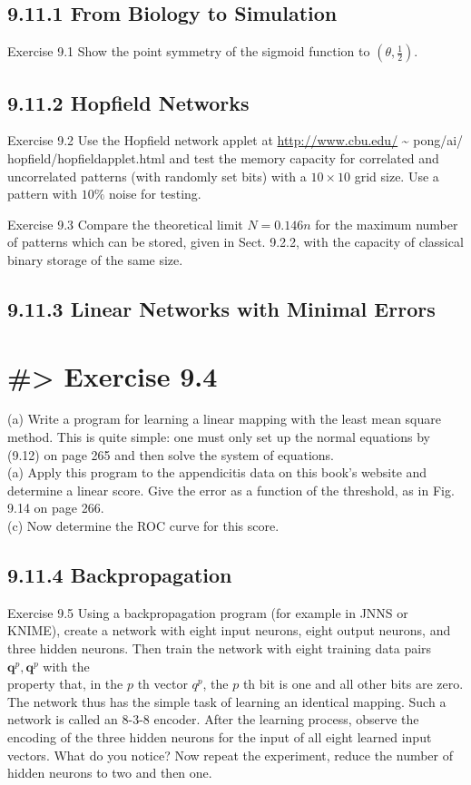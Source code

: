 \documentclass[10pt]{article}
\begin{document}
\subsection*{9.11.1 From Biology to Simulation}
Exercise 9.1 Show the point symmetry of the sigmoid function to $\left(\theta, \frac{1}{2}\right)$.

\subsection*{9.11.2 Hopfield Networks}
Exercise 9.2 Use the Hopfield network applet at \href{http://www.cbu.edu/}{http://www.cbu.edu/} \~{} pong/ai/ hopfield/hopfieldapplet.html and test the memory capacity for correlated and uncorrelated patterns (with randomly set bits) with a $10 \times 10$ grid size. Use a pattern with $10 \%$ noise for testing.

Exercise 9.3 Compare the theoretical limit $N=0.146 n$ for the maximum number of patterns which can be stored, given in Sect. 9.2.2, with the capacity of classical binary storage of the same size.

\subsection*{9.11.3 Linear Networks with Minimal Errors}
\section*{\#> Exercise 9.4}
(a) Write a program for learning a linear mapping with the least mean square method. This is quite simple: one must only set up the normal equations by (9.12) on page 265 and then solve the system of equations.\\
(a) Apply this program to the appendicitis data on this book's website and determine a linear score. Give the error as a function of the threshold, as in Fig. 9.14 on page 266.\\
(c) Now determine the ROC curve for this score.

\subsection*{9.11.4 Backpropagation}
Exercise 9.5 Using a backpropagation program (for example in JNNS or KNIME), create a network with eight input neurons, eight output neurons, and three hidden neurons. Then train the network with eight training data pairs $\boldsymbol{q}^{p}, \boldsymbol{q}^{p}$ with the\\
property that, in the $p$ th vector $q^{p}$, the $p$ th bit is one and all other bits are zero. The network thus has the simple task of learning an identical mapping. Such a network is called an 8-3-8 encoder. After the learning process, observe the encoding of the three hidden neurons for the input of all eight learned input vectors. What do you notice? Now repeat the experiment, reduce the number of hidden neurons to two and then one.
\end{document}
